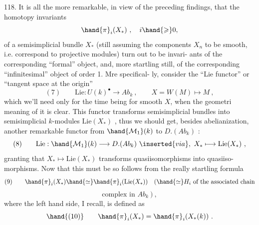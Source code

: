 118. It is all the more remarkable, in view of the preceding findings,
that the homotopy invariants
\[ \hand{\pi}_i(X_*) \ , \quad i \hand{\geqslant} 0 , \]
of a  semisimplicial  bundle $X_*$ (still assuming the components $X_n$ to be
smooth, i.e.  correspond to projective modules) turn out to be invari-%
ants of the corresponding ``formal'' object, and, more startling still,
of the corresponding ``infinitesimal'' object of order 1. Mre specifical-%
ly, consider the ``Lie functor'' or ``tangent space at the origin''
\[ (7) \qquad \mathrm{Lie}: U(k)^{\bullet} \longrightarrow Ab_k \ , \qquad X = W(M) \longmapsto M \ , \]
which we'll need only for the time being for smooth $X$, when the geometri
meaning of it is clear. This functor transforms semisimplicial  bundles
into semisimplicial $k$-modules $\mathrm{Lie}(X_*)$ , thus we should get, besides
abelianization, another remarkable functor\hand{,} from $\hand{\mathcal{M}_1}(k)$  to $D.(Ab_k)$ :
\[ (8) \qquad \mathrm{Lie}: \hand{\mathcal{M}_1}(k) \longrightarrow D.(Ab_k) \ \inserted{via}, \ X_* \longmapsto \mathrm{Lie}(X_*) \ , \]
granting that $X_* \mapsto \mathrm{Lie}(X_*)$ transforms quasiisomorphisms into quasiiso-%
morphisms. Now that this must be so follows from the really startling
formula
\[ (9) \qquad \hand{\pi}_i(X_*) \hand{\simeq} \hand{\pi}_i(\mathrm{Lie}(X_*)) \quad (\hand{\simeq} H_i \text{ of the associated chain} \]
\[ \text{complex in } Ab_k \ ) \ , \]
where the left hand side, I recall, is defined as
\[ \hand{(10)} \qquad \hand{\pi}_i(X_*) = \hand{\pi}_i(X_*(k)) \ . \]

